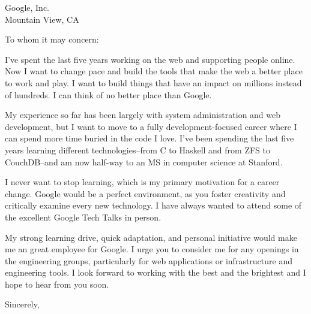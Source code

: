 \documentclass{letter}[11pt]
\begin{document}
\begin{letter}{Google, Inc.\\
Mountain View, CA
}

\opening{To whom it may concern:}

I've spent the last five years working on the web and supporting people online.  Now I want to change pace and build the tools that make the web a better place to work and play.  I want to build things that have an impact on millions instead of hundreds.  I can think of no better place than Google.

My experience so far has been largely with system administration and web development, but I want to move to a fully development-focused career where I can spend more time buried in the code I love.  I've been spending the last five years learning different technologies--from C to Haskell and from ZFS to CouchDB--and am now half-way to an MS in computer science at Stanford.

I never want to stop learning, which is my primary motivation for a career change.  Google would be a perfect environment, as you foster creativity and critically examine every new technology.  I have always wanted to attend some of the excellent Google Tech Talks in person.

My strong learning drive, quick adaptation, and personal initiative would make me an great employee for Google.  I urge you to consider me for any openings in the engineering groups, particularly for web applications or infrastructure and engineering tools.  I look forward to working with the best and the brightest and I hope to hear from you soon.

\closing{Sincerely,}
\end{letter}
\end{document}
